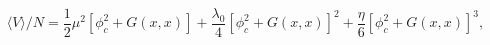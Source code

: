 \begin{equation}
\langle V \rangle /N = \frac{1}{2} \mu^2  [\phi_c^2+G(x,x)]
+\frac{\lambda_0}{4}  [\phi_c^2+G(x,x)]^2+
\frac{\eta}{6}
 [\phi_c^2+G(x,x)]^3,
\end{equation}

